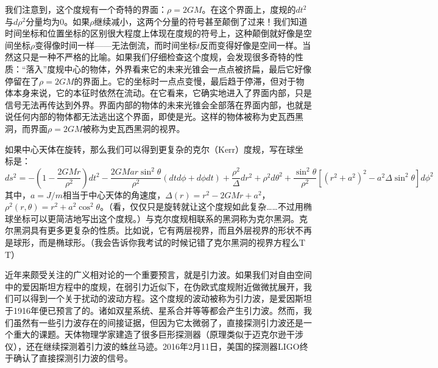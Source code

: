 \documentclass{ctexart}
\begin{document}
我们注意到，这个度规有一个奇特的界面：$\rho=2GM$。在这个界面上，度规的$dt^2$与$d\rho^2$分量均为0。如果$\rho$继续减小，这两个分量的符号甚至颠倒了过来！我们知道时间坐标和位置坐标的区别很大程度上体现在度规的符号上，这种颠倒就好像是空间坐标$\rho$变得像时间一样——无法倒流，而时间坐标$t$反而变得好像是空间一样。当然这只是一种不严格的比喻。如果我们仔细检查这个度规，会发现很多奇特的性质：“落入”度规中心的物体，外界看来它的未来光锥会一点点被挤扁，最后它好像停留在了$\rho=2GM$的界面上。它的坐标时一点点变慢，最后趋于停滞，但对于物体本身来说，它的本征时依然在流动。在它看来，它确实地进入了界面内部，只是信号无法再传达到外界。界面内部的物体的未来光锥会全部落在界面内部，也就是说任何内部的物体都无法逃出这个界面，即使是光。这样的物体被称为史瓦西黑洞，而界面$\rho=2GM$被称为史瓦西黑洞的视界。

如果中心天体在旋转，那么我们可以得到更复杂的克尔（Kerr）度规，写在球坐标是：
\begin{equation}
ds^2=-\left(1-\frac{2GMr}{\rho^2}\right)dt^2-\frac{2GMar\sin^2\theta}{\rho^2}(dtd\phi+d\phi dt)+\frac{\rho^2}{\Delta}dr^2+\rho^2d\theta^2+\frac{\sin^2\theta}{\rho^2}[(r^2+a^2)^2-a^2\Delta\sin^2\theta]d\phi^2
\end{equation}
其中，$a=J/m$相当于中心天体的角速度，$\Delta(r)=r^2-2GMr+a^2$，$\rho^2(r,\theta)=r^2+a^2\cos^2\theta$。（看，仅仅只是旋转就让这个度规如此复杂……不过用椭球坐标可以更简洁地写出这个度规。）与克尔度规相联系的黑洞称为克尔黑洞。克尔黑洞具有更多更复杂的性质。比如说，它有两层视界，而且外层视界的形状不再是球形，而是椭球形。（我会告诉你我考试的时候记错了克尔黑洞的视界方程么T T）

近年来颇受关注的广义相对论的一个重要预言，就是引力波。如果我们对自由空间中的爱因斯坦方程中的度规，在弱引力近似下，在伪欧式度规附近做微扰展开，我们可以得到一个关于扰动的波动方程。这个度规的波动被称为引力波，是爱因斯坦于1916年便已预言了的。诸如双星系统、星系合并等等都会产生引力波。然而，我们虽然有一些引力波存在的间接证据，但因为它太微弱了，直接探测引力波还是一个重大的课题。天体物理学家建造了很多巨形探测器（原理类似于迈克尔逊干涉仪），还在继续探测着引力波的蛛丝马迹。2016年2月11日，美国的探测器LIGO终于确认了直接探测引力波的信号。
\end{document}
